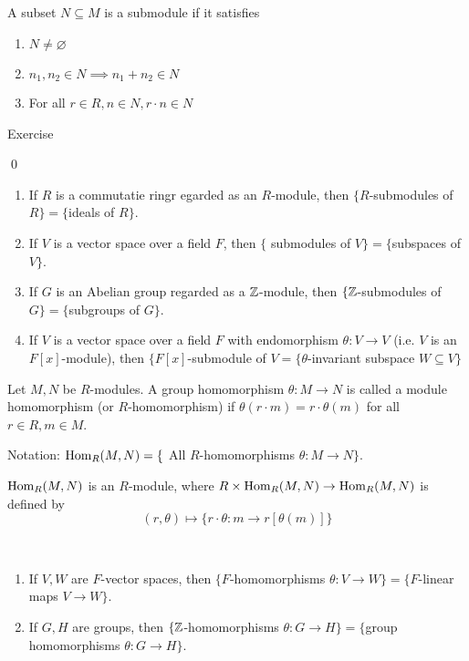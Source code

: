 \documentclass[x11names,reqno,14pt]{extarticle}
\begin{document}
\prop

A subset $N \subseteq M$ is a submodule if it satisfies

\begin{enumerate}

\item $N\neq \varnothing$

\item $n_1, n_2 \in N \implies n_1 + n_2 \in N$

\item For all $r \in R, n \in N, r\cdot n \in N$

\end{enumerate}

\proof

Exercise

\qed

\exm

\begin{enumerate}

\item If $R$ is a commutatie ringr egarded as an $R$-module, then $\{R$-submodules of $R\} = \{$ideals of $R\}$. 

\item If $V$ is a vector space over a field $F$, then $\{$ submodules of  $V\} = \{$subspaces of $V\}$.

\item If $G$ is an Abelian group regarded as a $\mathbb{Z}$-module, then $\{\mathbb{Z}$-submodules of $G\} = \{$subgroups of $G\}$. 

\item If $V$ is a vector space over a field $F$ with endomorphism $\theta:V\to V$ (i.e. $V$ is an $F[x]$-module), then $\{F[x]$-submodule of $V = \{\theta$-invariant subspace $W\subseteq V\}$

\end{enumerate}


Let $M, N$ be $R$-modules. A group homomorphism $\theta:M\to N$ is called a module homomorphism (or $R$-homomorphism) if $\theta(r\cdot m) = r\cdot\theta(m)$ for all $r \in R, m \in M$. 

Notation: ${\mathrm{Hom}}_R(M, N) = \{$ All $R$-homomorphisms $\theta:M\to N\}$. 

${\mathrm{Hom}}_R(M, N)$ is an $R$-module, where $R\times{\mathrm{Hom}}_R(M, N)\to {\mathrm{Hom}}_R(M, N)$ is defined by 
\[
(r, \theta) \mapsto \{r\cdot \theta:m\to r[\theta(m)]\}
\]

\exm\,

\begin{enumerate}

\item If $V, W$ are $F$-vector spaces, then $\{F$-homomorphisms $\theta:V\to W\} = \{F$-linear maps $V\to W\}$. 

\item If $G, H$ are groups, then $\{\mathbb{Z}$-homomorphisms $\theta:G\to H\} = \{$group homomorphisms $\theta:G\to H\}$. 

\end{enumerate}
\end{document}
